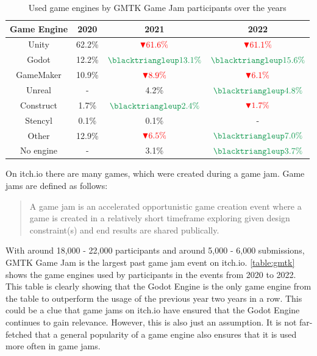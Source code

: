 \begin{table}[h!]
    \centering
    \begin{tabular}{|c c c c|}
        \hline
        Game Engine & 2020   & 2021                                               & 2022                                               \\
        \hline\hline
        Unity       & 62.2\% & $\textcolor{red}{\blacktriangledown 61.6\%}$       & $\textcolor{red}{\blacktriangledown 61.1\%}$       \\
        Godot       & 12.2\% & $\textcolor{ForestGreen}{\blacktriangleup 13.1\%}$ & $\textcolor{ForestGreen}{\blacktriangleup 15.6\%}$ \\
        GameMaker   & 10.9\% & $\textcolor{red}{\blacktriangledown 8.9\% }$       & $\textcolor{red}{\blacktriangledown 6.1\%}$        \\
        Unreal      & -      & 4.2\%                                              & $\textcolor{ForestGreen}{\blacktriangleup 4.8\%}$  \\
        Construct   & 1.7\%  & $\textcolor{ForestGreen}{\blacktriangleup 2.4\%}$  & $\textcolor{red}{\blacktriangledown 1.7\%}$        \\
        Stencyl     & 0.1\%  & 0.1\%                                              & -                                                  \\
        Other       & 12.9\% & $\textcolor{red}{\blacktriangledown 6.5\%}$        & $\textcolor{ForestGreen}{\blacktriangleup 7.0\%}$  \\
        No engine   & -      & 3.1\%                                              & $\textcolor{ForestGreen}{\blacktriangleup 3.7\%}$  \\
        \hline
    \end{tabular}
    \caption{Used game engines by GMTK Game Jam participants over the years\cite{gmtk-twitter}}
    \label{table:gmtk}
\end{table}

On itch.io there are many games, which were created during a game jam.
Game jams are defined as follows:
\blockquote{A game jam is an accelerated opportunistic game creation event where a game is created in a relatively short timeframe exploring given design constraint(s) and end results are shared publically\cite{game-jam-definition}.}
With around 18,000 - 22,000 participants and around 5,000 - 6,000 submissions, GMTK Game Jam is the largest past game jam event on itch.io\cite{itch-past-jams}.
\autoref{table:gmtk} shows the game engines used by participants in the events from 2020 to 2022.
This table is clearly showing that the Godot Engine is the only game engine from the table to outperform the usage of the previous year two years in a row.
This could be a clue that game jams on itch.io have ensured that the Godot Engine continues to gain relevance.
However, this is also just an assumption.
It is not far-fetched that a general popularity of a game engine also ensures that it is used more often in game jams.\\

